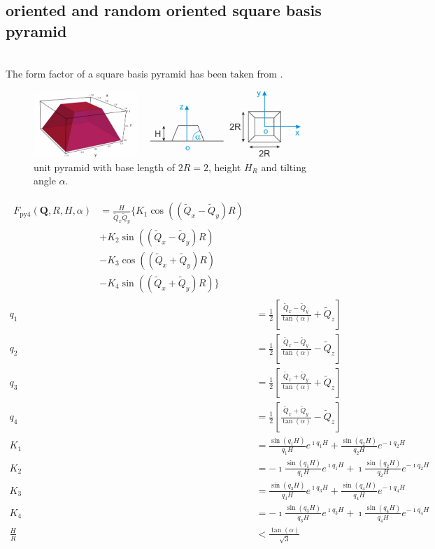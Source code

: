 \subsection{oriented and random oriented square basis pyramid} ~\\
The form factor of a square basis pyramid has been taken from \cite{Renaud2009}.
\begin{figure}[htb]
\begin{center}
\includegraphics[width=0.9\textwidth]{../images/form_factor/oriented_primitive_opbjects/pyramid4.png}
\end{center}
\caption{unit pyramid with base length of $2R=2$, height $H_R$ and tilting angle $\alpha$.}
\label{fig:opo_pyramid4}
\end{figure}
\begin{align}\label{eq:opo_pyramid4}
\begin{split}
 F_\mathrm{py4}(\mathbf{Q},R,H,\alpha) & = \frac{H}{\tilde{Q}_x\tilde{Q}_y} \bigg\{
        K_1\cos\left(\left(\tilde{Q}_x-\tilde{Q}_y\right)R\right) \\
      & + K_2\sin\left(\left(\tilde{Q}_x-\tilde{Q}_y\right)R\right) \\
      & - K_3\cos\left(\left(\tilde{Q}_x+\tilde{Q}_y\right)R\right) \\
      & - K_4\sin\left(\left(\tilde{Q}_x+\tilde{Q}_y\right)R\right)\bigg\}
\end{split} \\
  q_1 & =\frac12 \left[\frac{\tilde{Q}_x-\tilde{Q}_y}{\tan(\alpha)}+\tilde{Q}_z\right]\\
  q_2 & =\frac12 \left[\frac{\tilde{Q}_x-\tilde{Q}_y}{\tan(\alpha)}-\tilde{Q}_z\right]\\
  q_3 & =\frac12 \left[\frac{\tilde{Q}_x+\tilde{Q}_y}{\tan(\alpha)}+\tilde{Q}_z\right]\\
  q_4 & =\frac12 \left[\frac{\tilde{Q}_x+\tilde{Q}_y}{\tan(\alpha)}-\tilde{Q}_z\right] \\
  K_1 &= \frac{\sin(q_1H)}{q_1H} e^{\imath q_1H}+\frac{\sin(q_2H)}{q_2H} e^{-\imath q_2H}\\
  K_2 &= -\imath \frac{\sin(q_1H)}{q_1H} e^{\imath q_1H}+\imath \frac{\sin(q_2H)}{q_2H} e^{-\imath q_2H}\\
  K_3 &= \frac{\sin(q_3H)}{q_3H} e^{\imath q_3H}+\frac{\sin(q_4H)}{q_4H} e^{-\imath q_4H}\\
  K_4 &= -\imath \frac{\sin(q_3H)}{q_3H} e^{\imath q_3H}+\imath \frac{\sin(q_4H)}{q_4H} e^{-\imath q_4H}\\
  \frac{H}{R} & < \frac{\tan(\alpha)}{\sqrt{3}}
\end{align}

